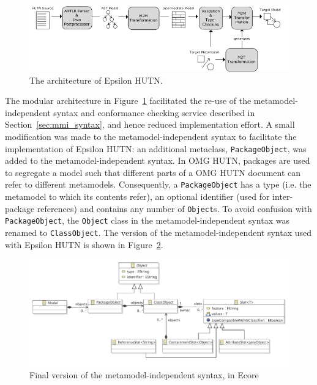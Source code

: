 \begin{figure}[htbp]
  \begin{center}
    \leavevmode
    \includegraphics[scale=0.44]{5.Implementation/hutn_workflow.png}
  \end{center}
  \caption{The architecture of Epsilon HUTN.}
  \label{fig:architecture}
\end{figure}

The modular architecture in Figure~\ref{fig:architecture} facilitated the re-use of the me\-ta\-mo\-del-inde\-pe\-nd\-ent syntax and conformance checking service described in Section~\ref{sec:mmi_syntax}, and hence reduced implementation effort. A small modification was made to the metamodel-independent syntax to facilitate the implementation of Epsilon HUTN: an additional metaclass, \texttt{Pa\-ck\-a\-geOb\-je\-ct}, was added to the metamodel-independent syntax. In OMG HUTN, packages are used to segregate a model such that different parts of a OMG HUTN document can refer to different metamodels. Consequently, a \texttt{Pa\-ck\-a\-geOb\-je\-ct} has a type (i.e. the metamodel to which its contents refer), an optional identifier (used for inter-package references) and contains any number of \texttt{Ob\-je\-ct}s. To avoid confusion with \texttt{Pa\-ck\-a\-geOb\-je\-ct}, the \texttt{Ob\-je\-ct} class in the metamodel-independent syntax was renamed to \texttt{Cl\-a\-ssOb\-je\-ct}. The version of the me\-ta\-mo\-del-inde\-pe\-nd\-ent syntax used with Epsilon HUTN is shown in Figure~\ref{fig:mmi_syntax_hutn}.

\begin{figure}[htbp]
  \centering
  \includegraphics[width=12cm]{5.Implementation/images/slot_model_final.pdf}
  \caption{Final version of the metamodel-independent syntax, in Ecore}
  \label{fig:mmi_syntax_hutn}
\end{figure}

